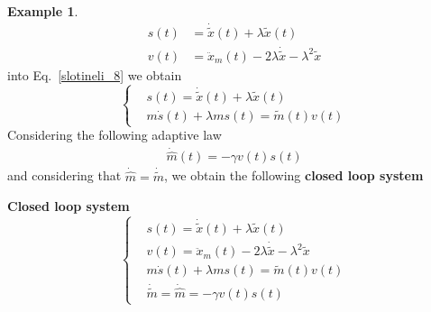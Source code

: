 \documentclass[11pt,a4paper,oneside]{book}
\numberwithin{equation}{section}
\theoremstyle{it}
\theoremstyle{definition}
\newtheorem{example}{Example}[chapter]
\begin{document}
\begin{example}
\begin{equation}
\begin{aligned}
			s(t) &= \dot{\tilde{x}}(t)+\lambda\tilde{x}(t) \\[6pt]
			v(t) &= \ddot{x}_m(t)-2\lambda\dot{\tilde{x}}-\lambda^2\tilde{x}
		\end{aligned}
	\end{equation} 
	into Eq.~\ref{slotineli_8} we obtain 
	\begin{equation}\label{slotineli_10}
		\left\lbrace \begin{aligned}
			&s(t) = \dot{\tilde{x}}(t)+\lambda\tilde{x}(t) \\[6pt]
			&m\dot{s}(t)+\lambda m s(t) = \tilde{m}(t)v(t)
		\end{aligned}\right. 
	\end{equation} 
	Considering the following adaptive law
	\begin{equation}\label{slotineli_11}
		\begin{aligned}
			\dot{\hat{m}}(t) = -\gamma v(t) s(t)
		\end{aligned}
	\end{equation} 
	and considering that $\dot{\hat{m}}=\dot{\tilde{m}}$, we obtain the following \textbf{closed loop system}
	\begin{mybox}
		\textbf{Closed loop system}
		\begin{equation}\label{slotineli_10e}
			\left\lbrace \begin{aligned}
				&s(t) = \dot{\tilde{x}}(t)+\lambda\tilde{x}(t) \\[6pt]
				&v(t) = \ddot{x}_m(t)-2\lambda\dot{\tilde{x}}-\lambda^2\tilde{x} \\[6pt]
				&m\dot{s}(t)+\lambda m s(t) = \tilde{m}(t)v(t) \\[6pt]
				&\dot{\tilde{m}} = \dot{\hat{m}} =-\gamma v(t)s(t)
			\end{aligned}\right. 
		\end{equation} 
		\vspace{0mm}
	\end{mybox}
	

\end{example}
\end{document}
